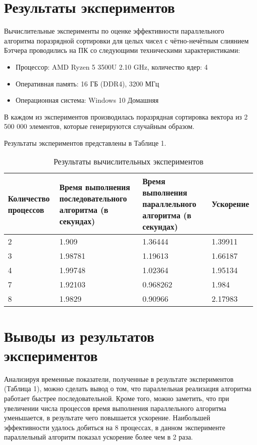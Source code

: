 \documentclass{report}
\begin{document}
\section*{Результаты экспериментов}
Вычислительные эксперименты по оценке эффективности параллельного алгоритма поразрядной сортировки для целых чисел с чётно-нечётным слиянием Бэтчера проводились на ПК со следующими техническими характеристиками:
\begin{itemize}
\item Процессор: AMD Ryzen 5 3500U 2.10 GHz, количество ядер: 4
\item Оперативная память: 16 ГБ (DDR4), 3200 МГц
\item Операционная система: Windows 10 Домашняя
\end{itemize}

\par В каждом из экспериментов производилась поразрядная сортировка вектора из 2 500 000 элементов, которые генерируются случайным образом.

\par Результаты экспериментов представлены в Таблице 1.

\begin{table}[!h]
\centering
\begin{tabular}{| p{2cm} | p{4cm} | p{4cm} | p{2cm} |}
\hline
Количество процессов & Время выполнения последовательного алгоритма (в секундах) & Время выполнения параллельного алгоритма (в секундах) & Ускорение  \\[5pt]
\hline
2      & 1.909    & 1.36444     & 1.39911       \\
\hline
3       & 1.98781    & 1.19613     & 1.66187      \\
\hline
4       & 1.99748     & 1.02364     & 1.95134       \\
\hline
7      & 1.92103    & 0.968262     & 1.984       \\
\hline
8       & 1.9829    & 0.90966     & 2.17983      \\
\hline
\end{tabular}
\caption{Результаты вычислительных экспериментов}

\end{table}


\newpage

\section*{Выводы из результатов экспериментов}
\par Анализируя временные показатели, полученные в результате экспериментов (Таблица 1), можно сделать вывод о том, что параллельная реализация алгоритма работает быстрее последовательной. Кроме того, можно заметить, что при увеличении числа процессов время выполнения параллельного алгоритма уменьшается, в результате чего повышается ускорение. Наибольшей эффективности удалось добиться на 8 процессах, в данном эксперименте параллельный алгоритм показал ускорение более чем в 2 раза.
\newpage
\end{document}
